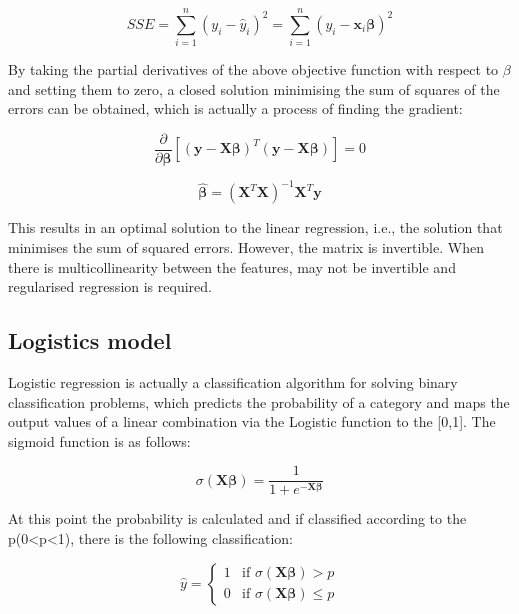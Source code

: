 \documentclass[conference]{IEEEtran}
\begin{document}
\begin{equation}
    SSE = \sum_{i=1}^{n} (y_i - \hat{y}_i)^2 = \sum_{i=1}^{n} (y_i - \mathbf{x}_i \boldsymbol{\beta})^2
\end{equation}

By taking the partial derivatives of the above objective function with respect to \( \beta \) and setting them to zero, a closed solution minimising the sum of squares of the errors can be obtained, which is actually a process of finding the gradient:

\begin{equation}
    \frac{\partial}{\partial \boldsymbol{\beta}} \left[ ( \mathbf{y} - \mathbf{X} \boldsymbol{\beta} )^T ( \mathbf{y} - \mathbf{X} \boldsymbol{\beta} ) \right] = 0
\end{equation}

\begin{equation}
    \hat{\boldsymbol{\beta}} = (\mathbf{X}^T \mathbf{X})^{-1} \mathbf{X}^T \mathbf{y}
\end{equation}

This results in an optimal solution to the linear regression, i.e., the solution that minimises the sum of squared errors. However, the matrix is invertible. When there is multicollinearity between the features,   may not be invertible and regularised regression is required.

\subsection{Logistics model}

Logistic regression is actually a classification algorithm for solving binary classification problems, which predicts the probability of a category and maps the output values of a linear combination via the Logistic function to the [0,1]. The sigmoid function is as follows:

\begin{equation}
    \sigma(\mathbf{X} \boldsymbol{\beta}) = \frac{1}{1 + e^{-\mathbf{X} \boldsymbol{\beta}}}
\end{equation}

At this point the probability is calculated and if classified according to the p(0<p<1), there is the following classification:

\begin{equation}
    \hat{y} =
    \begin{cases}
        1 & \text{if } \sigma(\mathbf{X} \boldsymbol{\beta}) > p \\
        0 & \text{if } \sigma(\mathbf{X} \boldsymbol{\beta}) \le p
    \end{cases}
\end{equation}
\end{document}
